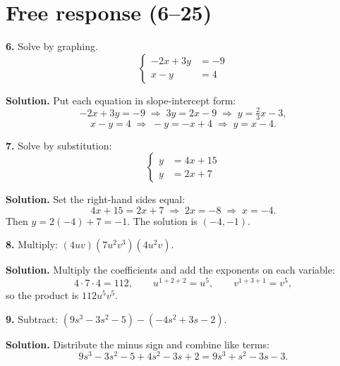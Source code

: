 \documentclass{ximera}
\begin{document}
\section*{Free response (6--25)}

\begin{problem}

\textbf{6.} Solve by graphing.
\[
  \left\{\begin{aligned}
    -2x+3y &= -9 \\
    x-y &= 4
  \end{aligned}\right.
\]

\begin{hint}
\textbf{Solution.} Put each equation in slope-intercept form:
\[
  -2x+3y=-9 \;\Longrightarrow\; 3y=2x-9 \;\Longrightarrow\; y=\tfrac{2}{3}x-3,
\]
\[
  x-y=4 \;\Longrightarrow\; -y=-x+4 \;\Longrightarrow\; y=x-4 .
\]
\figbox{\gridsm}
\end{hint}
\end{problem}

\begin{problem}

\textbf{7.} Solve by substitution:
\[
  \left\{\begin{aligned}
    y &= 4x+15 \\
    y &= 2x+7
  \end{aligned}\right.
\]

\begin{hint}
\textbf{Solution.} Set the right-hand sides equal:
\[
  4x+15 = 2x+7 \;\Longrightarrow\; 2x = -8 \;\Longrightarrow\; x = -4 .
\]
Then $y = 2(-4)+7 = -1$. The solution is $(-4,-1)$.
\end{hint}
\end{problem}

\begin{problem}

\textbf{8.} Multiply: $(4uv)\left(7u^{2}v^{3}\right)\left(4u^{2}v\right)$.

\begin{hint}
\textbf{Solution.} Multiply the coefficients and add the exponents on each variable:
\[
  4\cdot 7\cdot 4 = 112, \qquad u^{1+2+2}=u^{5}, \qquad v^{1+3+1}=v^{5},
\]
so the product is $112u^{5}v^{5}$.
\end{hint}
\end{problem}

\begin{problem}

\textbf{9.} Subtract: $\left(9s^{3}-3s^{2}-5\right)-\left(-4s^{2}+3s-2\right)$.

\begin{hint}
\textbf{Solution.} Distribute the minus sign and combine like terms:
\[
  9s^{3}-3s^{2}-5+4s^{2}-3s+2 = 9s^{3}+s^{2}-3s-3 .
\]
\end{hint}
\end{problem}
\end{document}
